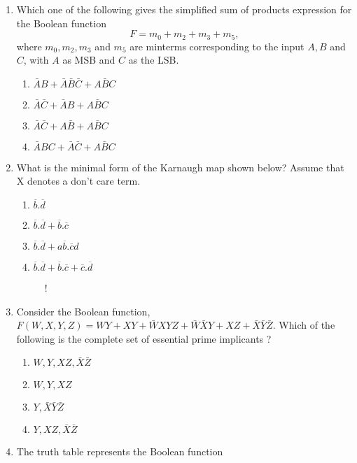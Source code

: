 \documentclass[journal,12pt,twocolumn]{IEEEtran}
\begin{document}
\begin{enumerate}
\item Which one of the following gives the simplified sum of products expression for the Boolean function
%
\begin{equation*}
F = m_0 + m_2 + m_3 + m_5,
\end{equation*}
%
where $m_0,m_2,m_3$ and $m_5$ are minterms corresponding to the input $A,B$ and $C$, with $A$ as MSB and $C$ as the
LSB.
\begin{enumerate}
\item $\bar{A}B + \bar{A}\bar{B}\bar{C}+A\bar{B}C$
\item $\bar{A}\bar{C}+\bar{A}B+A\bar{B}C$
\item $\bar{A}\bar{C}+A\bar{B}+A\bar{B}C$
\item $\bar{A}BC+\bar{A}\bar{C}+A\bar{B}C$
\end{enumerate}
\item What is the minimal form of the Karnaugh map shown below? Assume that X denotes a don't
care term.

     \begin{enumerate}
      \item $\overline{b}.\overline{d}$ 
      \item $\overline{b}.\overline{d}+\overline{b}.\overline{c}$
      \item $\overline{b}.\overline{d}+a\overline{b}.\overline{c}d$
      \item $\overline{b}.\overline{d}+\overline{b}.\overline{c}+\overline{c}.\overline{d}$
    \end{enumerate}
\begin{figure}[!h]
\centering
\resizebox {\columnwidth} {!} {

}
\caption{}
\end{figure}
\item Consider the Boolean function,$F(W,X,Y,Z)=WY+XY+\bar{W}XYZ+\bar{W}\bar{X}Y+XZ+\bar{X}\bar{Y}\bar{Z}.$ Which of the following is the complete set of essential prime implicants ?
\begin{enumerate}
\item $W,Y,XZ,\bar{X}\bar{Z}$
\item $W,Y,XZ$
\item $Y,\bar{X}\bar{Y}\bar{Z}$
\item $Y,XZ,\bar{X}\bar{Z}$
\end{enumerate}
\item The truth table represents the Boolean function


\end{enumerate}
\end{document}
